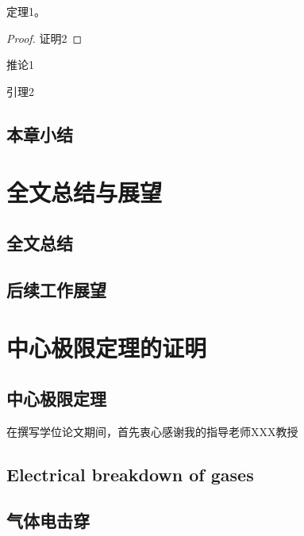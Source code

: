\documentclass[bachelor]{NCEPU-thesis}
\begin{document}
\begin{theorem}
定理1。
\end{theorem}
\begin{proof}
证明2
\end{proof}
\begin{corollary}
推论1
\end{corollary}
\begin{lemma}
引理2
\end{lemma}

\section{本章小结}

\chapter{全文总结与展望}

\section{全文总结}

\section{后续工作展望}






\nocite{*}


\thesisappendix

\chapter{中心极限定理的证明}

\section{中心极限定理}


\thesisacknowledgement
在撰写学位论文期间，首先衷心感谢我的指导老师XXX教授



\thesistranslationoriginal

\section{Electrical breakdown of gases}


\thesistranslationchinese

\section{气体电击穿}
\end{document}
